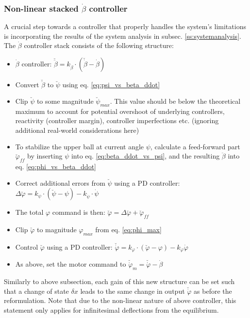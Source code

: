 \documentclass{article}
\begin{document}
\subsubsection{Non-linear stacked \texorpdfstring{$\dot{\beta}$}{betadot} controller}
A crucial step towards a controller that properly handles the system's limitations is incorporating the results of the system analysis in subsec. \ref{ss:systemanalysis}.
The $\dot{\beta}$ controller stack consists of the following structure:
\begin{itemize}
	\item{$\dot{\beta}$ controller: $\breve{\ddot{\beta}} = k_{\dot{\beta}} \cdot \left( \breve{\dot{\beta}} - \dot{\beta} \right)$}
	\item{Convert $\breve{\ddot{\beta}}$ to $\breve{\psi}$ using eq. \ref{eq:psi_vs_beta_ddot}}
	\item{Clip $\breve{\psi}$ to some magnitude $\breve{\psi}_{max}$. This value should be below the theoretical maximum to account for potential overshoot of underlying controllers, reactivity (controller margin), controller imperfections etc. (ignoring additional real-world considerations here)}
  \item{To stabilize the upper ball at current angle $\psi$, calculate a feed-forward part $\breve{\varphi}_{ff}$ by inserting $\psi$ into eq. \ref{eq:beta_ddot_vs_psi}, and the resulting $\ddot{\beta}$ into eq. \ref{eq:phi_vs_beta_ddot}}
  \item{Correct additional errors from $\breve{\psi}$ using a PD controller: $\Delta \breve{\varphi} =  k_{\psi} \cdot \left( \breve{\psi} - \psi \right) - k_{\dot{\psi}} \cdot \dot{\psi} $}
	\item{The total $\varphi$ command is then: $\breve{\varphi} = \Delta \breve{\varphi} + \breve{\varphi}_{ff} $}
  \item{Clip $\breve{\varphi}$ to magnitude $\varphi_{max}$ from eq. \ref{eq:phi_max}}
	\item{Control $\breve{\varphi}$ using a PD controller: $\breve{\dot{\varphi}} = k_{\varphi} \cdot \left( \breve{\varphi} - \varphi \right) - k_{\dot{\varphi}} \dot{\varphi}$}
	\item{As above, set the motor command to $\breve{\dot{\varphi}}_m = \breve{\dot{\varphi}} - \dot{\beta}$}
\end{itemize}
Similarly to above subsection, each gain of this new structure can be set such that a change of state $\delta x$ leads to the same change in output $\breve{\dot{\varphi}}$ as before the reformulation.
Note that due to the non-linear nature of above controller, this statement only applies for infinitesimal deflections from the equilibrium.
\end{document}
